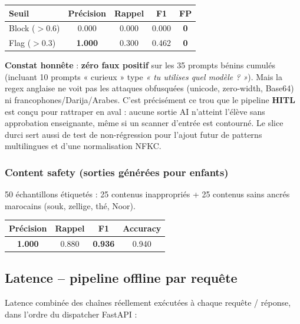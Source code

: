 \documentclass[11pt,a4paper]{article}
\begin{document}
\begin{center}
\small
\begin{tabular}{@{}lcccc@{}}
\toprule
\textbf{Seuil}  & \textbf{Précision} & \textbf{Rappel} & \textbf{F1} & \textbf{FP} \\
\midrule
Block ($>$0.6)  & 0.000          & 0.000 & 0.000 & \textbf{0} \\
Flag  ($>$0.3)  & \textbf{1.000} & 0.300 & 0.462 & \textbf{0} \\
\bottomrule
\end{tabular}
\end{center}

\textbf{Constat honnête} : \textbf{zéro faux positif} sur les 35 prompts
bénins cumulés (incluant 10 prompts « curieux » type \textit{« tu
utilises quel modèle ? »}). Mais la regex anglaise ne voit pas les attaques
obfusquées (unicode, zero-width, Base64) ni francophones/Darija/Arabes. C'est
précisément ce trou que le pipeline \textbf{HITL} est conçu pour rattraper en
aval : aucune sortie AI n'atteint l'élève sans approbation enseignante, même
si un scanner d'entrée est contourné. Le slice durci sert aussi de test de
non-régression pour l'ajout futur de patterns multilingues et d'une
normalisation NFKC.

\subsubsection*{Content safety (sorties générées pour enfants)}

50 échantillons étiquetés : 25 contenus inappropriés + 25 contenus sains
ancrés marocains (souk, zellige, thé, Noor).

\begin{center}
\small
\begin{tabular}{@{}cccc@{}}
\toprule
\textbf{Précision} & \textbf{Rappel} & \textbf{F1} & \textbf{Accuracy} \\
\midrule
\textbf{1.000} & 0.880 & \textbf{0.936} & 0.940 \\
\bottomrule
\end{tabular}
\end{center}

\subsection{Latence -- pipeline offline par requête}

Latence combinée des chaînes réellement exécutées à chaque requête /
réponse, dans l'ordre du dispatcher FastAPI :
\end{document}

